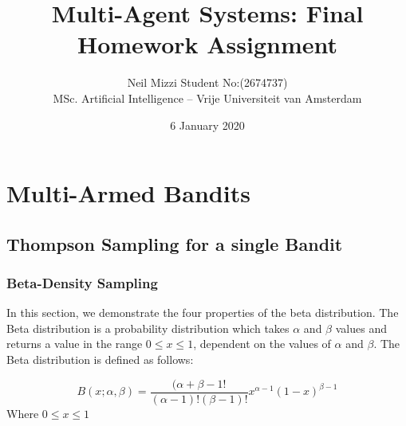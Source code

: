 \documentclass{article}
\title{Multi-Agent Systems: Final Homework Assignment}
\author{Neil Mizzi Student No:(2674737) \\ MSc. Artificial Intelligence -- Vrije Universiteit van Amsterdam}
\date{6 January 2020}
\begin{document}
\maketitle

\section{Multi-Armed Bandits}
\subsection{Thompson Sampling for a single Bandit}
\subsubsection{Beta-Density Sampling}
In this section, we demonstrate the four properties of the beta distribution. The Beta distribution is a probability distribution which takes $\alpha$ and $\beta$ values and returns a value in the range $0 \leq x \leq 1$, dependent on the values of $\alpha$ and $\beta$. The Beta distribution is defined as follows:

\begin{equation}
    B(x; \alpha, \beta) = 
    \frac{(\alpha + \beta -1!}{(\alpha -1)!(\beta-1)!}x^{\alpha - 1}(1-x)^{\beta -1}
\end{equation}
Where  $0 \leq x \leq 1$
\end{document}
